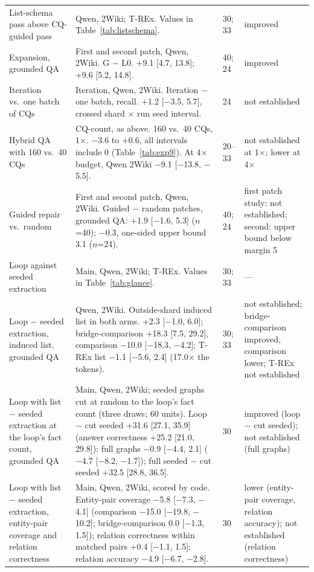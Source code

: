 \begin{table}[!t]
\begin{tabular}{P{3.5cm}P{9.4cm}P{0.8cm}P{3.9cm}}
List-schema pass above CQ-guided pass & Qwen, 2Wiki; T-REx. Values in Table~\ref{tab:listschema}. & 30; 33 & improved \\
Expansion, grounded QA & First and second patch, Qwen, 2Wiki. G $-$ L0. +9.1 [4.7, 13.8]; +9.6 [5.2, 14.8]. & 40; 24 & improved \\
Iteration vs.\ one batch of CQs & Iteration, Qwen, 2Wiki. Iteration $-$ one batch, recall. +1.2 [$-$3.5, 5.7], crossed shard $\times$ run seed interval. & 24 & not established \\
Hybrid QA with 160 vs.\ 40 CQs & CQ-count, as above. 160 vs.\ 40 CQs, 1$\times$. $-$3.6 to +0.6, all intervals include 0 (Table~\ref{tab:exp9}). At 4$\times$ budget, Qwen 2Wiki $-$9.1 [$-$13.8, $-$5.5]. & 20--33 & not established at 1$\times$; lower at 4$\times$ \\
Guided repair vs.\ random & First and second patch, Qwen, 2Wiki. Guided $-$ random patches, grounded QA: +1.9 [$-$1.6, 5.3] ($n$=40); $-$0.3, one-sided upper bound 3.1 ($n$=24). & 40; 24 & first patch study: not established; second: upper bound below margin 5 \\
Loop against seeded extraction & Main, Qwen, 2Wiki; T-REx. Values in Table~\ref{tab:glance}. & 30; 33 & --- \\
Loop $-$ seeded extraction, induced list, grounded QA & Qwen, 2Wiki. Outside-shard induced list in both arms. +2.3 [$-$1.0, 6.0]; bridge-comparison +18.3 [7.5, 29.2], comparison $-$10.0 [$-$18.3, $-$4.2]; T-REx list $-$1.1 [$-$5.6, 2.4] (17.0$\times$ the tokens). & 30; 33 & not established; bridge-comparison improved, comparison lower; T-REx not established \\
Loop with list $-$ seeded extraction at the loop's fact count, grounded QA & Main, Qwen, 2Wiki; seeded graphs cut at random to the loop's fact count (three draws; 60 units). Loop $-$ cut seeded +31.6 [27.1, 35.9] (answer correctness +25.2 [21.0, 29.8]); full graphs $-$0.9 [$-$4.4, 2.1] ($-$4.7 [$-$8.2, $-$1.7]); full seeded $-$ cut seeded +32.5 [28.8, 36.5]. & 30 & improved (loop $-$ cut seeded); not established (full graphs) \\
Loop with list $-$ seeded extraction, entity-pair coverage and relation correctness & Main, Qwen, 2Wiki, scored by code. Entity-pair coverage $-$5.8 [$-$7.3, $-$4.1] (comparison $-$15.0 [$-$19.8, $-$10.2]; bridge-comparison 0.0 [$-$1.3, 1.5]); relation correctness within matched pairs +0.4 [$-$1.1, 1.5]; relation accuracy $-$4.9 [$-$6.7, $-$2.8]. & 30 & lower (entity-pair coverage, relation accuracy); not established (relation correctness) \\

\end{tabular}
\end{table}
